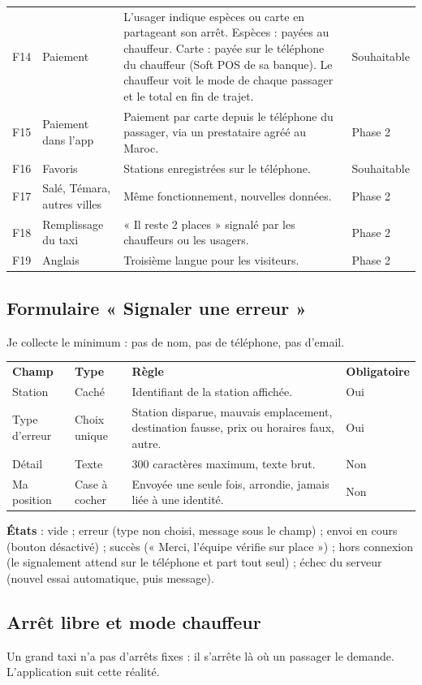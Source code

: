 \documentclass[11pt,a4paper]{article}
\newcommand{\hd}[1]{\textbf{\color{white}#1}}
\newcommand{\hdrow}{\rowcolor{brand}}
\begin{document}
\begin{xltabular}{\textwidth}{@{}l P{3.3cm} Y l@{}}
F14 & Paiement & L'usager indique espèces ou carte en partageant son arrêt. Espèces : payées au chauffeur. Carte : payée sur le téléphone du chauffeur (Soft POS de sa banque). Le chauffeur voit le mode de chaque passager et le total en fin de trajet. & Souhaitable \\
F15 & Paiement dans l'app & Paiement par carte depuis le téléphone du passager, via un prestataire agréé au Maroc. & Phase 2 \\
F16 & Favoris & Stations enregistrées sur le téléphone. & Souhaitable \\
F17 & Salé, Témara, autres villes & Même fonctionnement, nouvelles données. & Phase 2 \\
F18 & Remplissage du taxi & « Il reste 2 places » signalé par les chauffeurs ou les usagers. & Phase 2 \\
F19 & Anglais & Troisième langue pour les visiteurs. & Phase 2 \\
\end{xltabular}

\subsection{Formulaire « Signaler une erreur »}
Je collecte le minimum : pas de nom, pas de téléphone, pas d'email.

\begin{xltabular}{\textwidth}{@{}l l Y l@{}}
\hdrow \hd{Champ} & \hd{Type} & \hd{Règle} & \hd{Obligatoire} \\
Station & Caché & Identifiant de la station affichée. & Oui \\
Type d'erreur & Choix unique & Station disparue, mauvais emplacement, destination fausse, prix ou horaires faux, autre. & Oui \\
Détail & Texte & 300 caractères maximum, texte brut. & Non \\
Ma position & Case à cocher & Envoyée une seule fois, arrondie, jamais liée à une identité. & Non \\
\end{xltabular}

\textbf{États} : vide ; erreur (type non choisi, message sous le champ) ; envoi en cours (bouton désactivé) ; succès (« Merci, l'équipe vérifie sur place ») ; hors connexion (le signalement attend sur le téléphone et part tout seul) ; échec du serveur (nouvel essai automatique, puis message).


\Needspace{8cm}
\subsection{Arrêt libre et mode chauffeur}
Un grand taxi n'a pas d'arrêts fixes : il s'arrête là où un passager le demande. L'application suit cette réalité.
\end{document}
